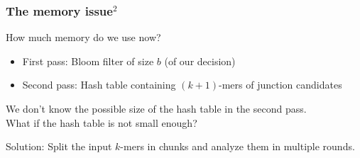\begin{frame}
	\frametitle{The memory issue$^{2}$}
	\centering
	
	How much memory do we use now?
	
	\medskip
	
	\begin{itemize}
	  \item First pass: Bloom filter of size $b$ (of our decision)
	  \item Second pass: Hash table containing $(k+1)$-mers of junction candidates
	\end{itemize}

	\medskip
	
	We don't know the possible size of the hash table in the second pass. \\
	What if the hash table is not small enough?
  
	\medskip

  Solution: Split the input $k$-mers in chunks and analyze them in multiple rounds.

\end{frame}


